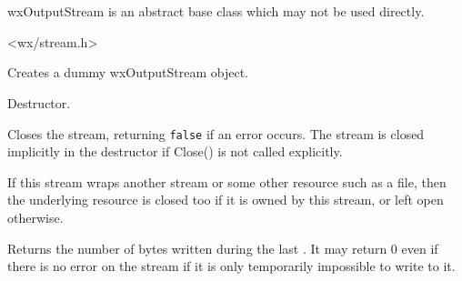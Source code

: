 \section{}\label{wxoutputstream}

wxOutputStream is an abstract base class which may not be used directly.




<wx/stream.h>





\label{wxoutputstreamctor}


Creates a dummy wxOutputStream object.


\label{wxoutputstreamdtor}


Destructor.


\label{wxoutputstreamclose}


Closes the stream, returning {\tt false} if an error occurs. The
stream is closed implicitly in the destructor if Close() is not
called explicitly.

If this stream wraps another stream or some other resource such
as a file, then the underlying resource is closed too if it is owned
by this stream, or left open otherwise.


\label{wxoutputstreamlastwrite}


Returns the number of bytes written during the last 
. It may return $0$ even if there is no
error on the stream if it is only temporarily impossible to write to it.



